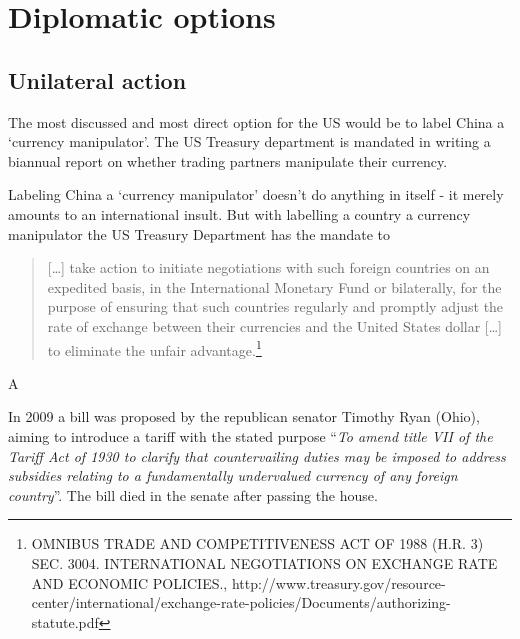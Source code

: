 \section{Diplomatic options}

\subsection{Unilateral action}

The most discussed and most direct option for the US would be to label China a `currency manipulator'. The US Treasury department is mandated in writing a biannual report on whether trading partners manipulate their currency.  

Labeling China a `currency manipulator' doesn't do anything in itself - it merely amounts to an international insult. But with labelling a country a currency manipulator the US Treasury Department has the mandate to
\begin{quote}
[\dots] take action to initiate negotiations with such foreign countries on an expedited basis, in the International Monetary Fund or bilaterally, for the purpose of ensuring that such countries regularly and promptly adjust the rate of exchange between their currencies and the United States dollar [\dots] to eliminate the unfair advantage.\footnote{OMNIBUS TRADE AND COMPETITIVENESS ACT OF 1988 (H.R. 3)
SEC. 3004. INTERNATIONAL NEGOTIATIONS ON EXCHANGE RATE AND ECONOMIC POLICIES., http://www.treasury.gov/resource-center/international/exchange-rate-policies/Documents/authorizing-statute.pdf}
\end{quote}

A




In 2009 a bill was proposed by the republican senator Timothy Ryan 
(Ohio), aiming to introduce a tariff with the stated purpose 
``\textit{To amend title VII of the Tariff Act of 1930 to clarify that 
	countervailing duties may be imposed to address subsidies relating 
	to a fundamentally undervalued currency of any foreign 
country}''\cite{Ryan2009}. The bill died in the senate after passing the 
house.

